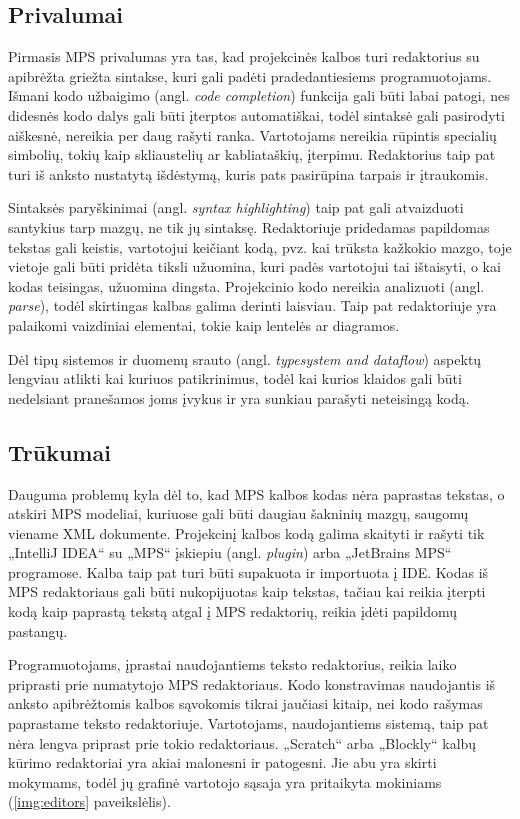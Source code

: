 \documentclass{VUMIFPSkursinis}
\begin{document}
\subsection{Privalumai}

Pirmasis MPS privalumas yra tas, kad projekcinės kalbos turi redaktorius su apibrėžta griežta sintakse, kuri gali padėti pradedantiesiems programuotojams. Išmani kodo užbaigimo (angl. \textit{code completion}) funkcija  gali būti labai patogi, nes didesnės kodo dalys gali būti įterptos automatiškai, todėl sintaksė gali pasirodyti aiškesnė, nereikia per daug rašyti ranka. Vartotojams nereikia rūpintis specialių simbolių, tokių kaip skliaustelių ar kabliataškių, įterpimu. Redaktorius taip pat turi iš anksto nustatytą išdėstymą, kuris pats pasirūpina tarpais ir įtraukomis.

Sintaksės paryškinimai (angl. \textit{syntax highlighting}) taip pat gali atvaizduoti santykius tarp mazgų, ne tik jų sintaksę. Redaktoriuje pridedamas papildomas tekstas gali keistis, vartotojui keičiant kodą, pvz. kai trūksta kažkokio mazgo, toje vietoje gali būti pridėta tiksli užuomina, kuri padės vartotojui tai ištaisyti, o kai kodas teisingas, užuomina dingsta. Projekcinio kodo nereikia analizuoti (angl. \textit{parse}), todėl skirtingas kalbas galima derinti laisviau. Taip pat  redaktoriuje yra palaikomi vaizdiniai elementai, tokie kaip lentelės ar diagramos.

Dėl tipų sistemos ir duomenų srauto (angl. \textit{typesystem and dataflow}) aspektų lengviau atlikti kai kuriuos patikrinimus, todėl kai kurios klaidos gali būti nedelsiant pranešamos joms įvykus ir yra sunkiau parašyti neteisingą kodą. \cite{klimevs2016domain}

\subsection{Trūkumai}

Dauguma problemų kyla dėl to, kad MPS kalbos kodas nėra paprastas tekstas, o atskiri MPS modeliai, kuriuose gali būti daugiau šakninių mazgų, saugomų viename XML dokumente. Projekcinį kalbos kodą galima skaityti ir rašyti tik „IntelliJ IDEA“ su „MPS“ įskiepiu (angl. \textit{plugin}) arba „JetBrains MPS“ programose. Kalba taip pat turi būti supakuota ir importuota į IDE. Kodas iš MPS redaktoriaus gali būti nukopijuotas kaip tekstas, tačiau kai reikia įterpti kodą kaip paprastą tekstą atgal į MPS redaktorių, reikia įdėti papildomų pastangų. 

Programuotojams, įprastai naudojantiems teksto redaktorius, reikia laiko priprasti prie numatytojo MPS redaktoriaus. Kodo konstravimas naudojantis iš anksto apibrėžtomis kalbos sąvokomis tikrai jaučiasi kitaip, nei kodo rašymas paprastame teksto redaktoriuje. Vartotojams, naudojantiems sistemą, taip pat nėra lengva priprast prie tokio redaktoriaus. „Scratch“ arba „Blockly“ kalbų kūrimo redaktoriai yra akiai malonesni ir patogesni. Jie abu yra skirti mokymams, todėl jų grafinė vartotojo sąsaja yra pritaikyta mokiniams (\ref{img:editors} paveikslėlis).
\end{document}
